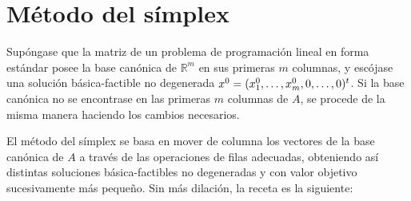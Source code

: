 \documentclass[11pt]{report}
\theoremstyle{mytheorem}
\theoremstyle{mydefinition}
\theoremstyle{myexample}
\newcommand{\R}{\mathbb R}
\begin{document}
\section{Método del símplex}

Supóngase que la matriz de un problema de programación lineal en forma estándar posee la base canónica de $\R^m$ en sus primeras $m$ columnas, y escójase una solución básica-factible no degenerada $x^0 = (x^0_1,\mathellipsis,x_m^0,0,\mathellipsis,0)^t$. Si la base canónica no se encontrase en las primeras $m$ columnas de $A$, se procede de la misma manera haciendo los cambios necesarios.



El método del símplex se basa en mover de columna los vectores de la base canónica de $A$ a través de las operaciones de filas adecuadas, obteniendo así distintas soluciones básica-factibles no degeneradas y con valor objetivo sucesivamente más pequeño. Sin más dilación, la receta es la siguiente:
\end{document}
